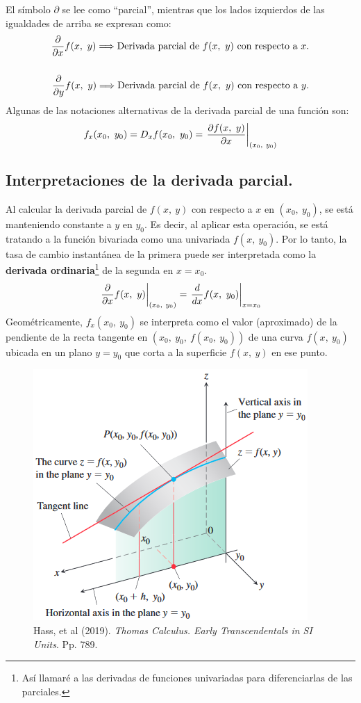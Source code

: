 \documentclass[12pt]{article}
\begin{document}
El símbolo $\partial$ se lee como ``parcial'', mientras que los lados izquierdos de las igualdades de arriba se expresan como:
\begin{align*}
  \derivpar{x} f(x, \ y) \Longrightarrow \text{Derivada parcial de } f(x, \ y) \text{ con respecto a } x. \\ \\
  \derivpar{y} f(x, \ y) \Longrightarrow \text{Derivada parcial de } f(x, \ y) \text{ con respecto a } y.
\end{align*}
Algunas de las notaciones alternativas de la derivada parcial de una función son:
\[
  f_{x}(x_{0}, \ y_{0}) = D_{x} f(x_{0}, \ y_{0}) = \left. \derivpar[f(x, \ y)]{x} \right|_{(x_{0}, \ y_{0})}
\]

\subsection{Interpretaciones de la derivada parcial.}

Al calcular la derivada parcial de $f(x, \ y)$ con respecto a $x$ en $(x_{0}, \ y_{0})$, se está manteniendo constante a $y$ en $y_{0}$. Es decir, al aplicar esta operación, se está tratando a la función bivariada como una univariada $f(x, \ y_{0})$. Por lo tanto, la tasa de cambio instantánea de la primera puede ser interpretada como la \textbf{derivada ordinaria}\footnote{Así llamaré a las derivadas de funciones univariadas para diferenciarlas de las parciales.} de la segunda en $x = x_{0}$.
\[
  \pderivpar{x}{f(x, \ y)}{(x_{0}, \ y_{0})} = \left. \deriv{x}{f(x, \ y_{0})}\right|_{x = x_{0}}
\]
Geométricamente, $f_{x}(x_{0}, \ y_{0})$ se interpreta como el valor (aproximado) de la pendiente de la recta tangente en $(x_{0}, \ y_{0}, \ f(x_{0}, \ y_{0}))$ de una curva $f(x, \ y_{0})$ ubicada en un plano $y = y_{0}$ que corta a la superficie $f(x, \ y)$ en ese punto.

\begin{figure}[hbt!]
\centering
\includegraphics[scale = 0.55]{deriv-parcial-interpretacion-geometrica.png}
\caption{Hass, et al (2019). \textit{Thomas Calculus. Early Transcendentals in SI Units}. Pp. 789.}
\end{figure}
\end{document}
